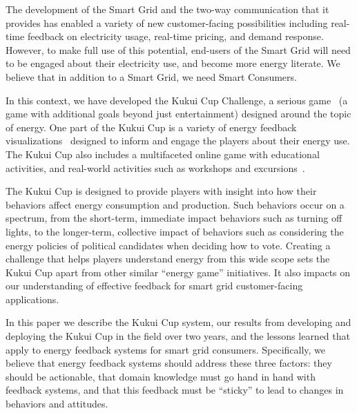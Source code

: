 \documentclass[10pt, conference, compsocconf]{IEEEtran}
\begin{document}
The development of the Smart Grid and the two-way communication that it provides has enabled a variety of new customer-facing possibilities including real-time feedback on electricity usage, real-time pricing, and demand response. However, to make full use of this potential, end-users of the Smart Grid will need to be engaged about their electricity use, and become more energy literate. We believe that in addition to a Smart Grid, we need Smart Consumers.

In this context, we have developed the Kukui Cup Challenge, a serious game~\cite{Zyda2005} (a game with additional goals beyond just entertainment) designed around the topic of energy. One part of the Kukui Cup is a variety of energy feedback visualizations~\cite{Froehlich2010} designed to inform and engage the players about their energy use. The Kukui Cup also includes a multifaceted online game with educational activities, and real-world activities such as workshops and excursions~\cite{csdl2-10-07}.

The Kukui Cup is designed to provide players with insight into how their behaviors affect energy consumption and production. Such behaviors occur on a spectrum, from the short-term, immediate impact behaviors such as turning off lights, to the longer-term, collective impact of behaviors such as considering the energy policies of political candidates when deciding how to vote. Creating a challenge that helps players understand energy from this wide scope sets the Kukui Cup apart from other similar ``energy game'' initiatives. It also impacts on our understanding of effective feedback for smart grid customer-facing applications.


In this paper we describe the Kukui Cup system, our results from developing and deploying the Kukui Cup in the field over two years, and the lessons learned that apply to energy feedback systems for smart grid consumers. Specifically, we believe that energy feedback systems should address these three factors: they should be actionable, that domain knowledge must go hand in hand with feedback systems, and that this feedback must be ``sticky'' to lead to changes in behaviors and attitudes.
\end{document}
